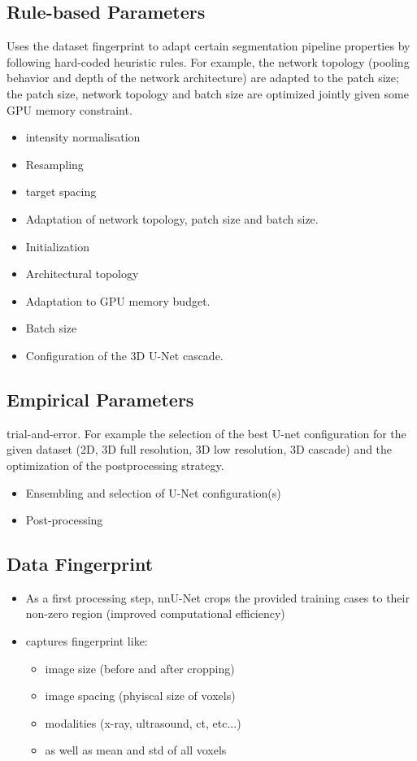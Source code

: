 \documentclass[11pt]{article}
\begin{document}
\subsection{Rule-based Parameters}

Uses the dataset fingerprint to adapt certain segmentation pipeline properties by following hard-coded heuristic rules. For example, the network topology (pooling behavior and depth of the network architecture) are adapted to the patch size; the patch size, network topology and batch size are optimized jointly given some GPU memory constraint.

\begin{itemize}
    \item intensity normalisation
    \item Resampling
    \item target spacing
    \item Adaptation of network topology, patch size and batch size.
    \item Initialization
    \item Architectural topology
    \item Adaptation to GPU memory budget.
    \item Batch size
    \item Configuration of the 3D U-Net cascade.
\end{itemize}

\subsection{Empirical Parameters}

trial-and-error. For example the selection of the best U-net configuration for the given dataset (2D, 3D full resolution, 3D low resolution, 3D cascade) and the optimization of the postprocessing strategy.

\begin{itemize}
    \item Ensembling and selection of U-Net configuration(s)
    \item Post-processing
\end{itemize}

\subsection{Data Fingerprint}

\begin{itemize}
    \item As a first processing step, nnU-Net crops the provided training cases to their non-zero region (improved computational efficiency)
    \item captures fingerprint like: \begin{itemize}
        \item image size (before and after cropping)
        \item image spacing (phyiscal size of voxels)
        \item modalities (x-ray, ultrasound, ct, etc...)
        \item as well as mean and std of all voxels
    \end{itemize}
\end{itemize}

\printbibliography
\end{document}

